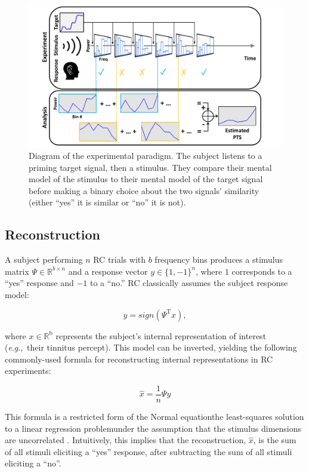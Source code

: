 \documentclass[journal]{IEEEtran}
\newcommand{\eg}{\textit{e}.\textit{g}.,\ }
\begin{document}
\begin{figure}[t]
  \centering
  \includegraphics[width=\linewidth]{experiment_overview.pdf}
  \caption{Diagram of the experimental paradigm. The subject listens to a priming target signal,
then a stimulus. They compare their mental model of the stimulus to their mental model of the target signal
before making a binary choice about the two signals' similarity (either ``yes'' it is similar or ``no'' it is not).}
  \label{fig:experimentdiagram}
\end{figure}

\subsection{Reconstruction}

A subject performing $n$ RC trials with $b$ frequency bins produces a stimulus matrix $\Psi \in \mathbb{R}^{b \times n}$
and a response vector $y \in \{1,-1\}^n$,
where $1$ corresponds to a ``yes'' response and $-1$ to a ``no.'' RC classically assumes the subject response model:

\begin{equation}
  y = sign(\Psi^\mathrm{T} x), 
\end{equation}

where $x \in \mathbb{R}^\mathrm{b}$ represents the subject's internal representation of interest (\eg their tinnitus percept).
This model can be inverted, yielding the following commonly-used formula for reconstructing internal representations in RC experiments:

\begin{equation}
  \hat{x} = \frac{1}{n} \Psi y
  \label{eq:linreg}
\end{equation}

This formula is a restricted form of the Normal equation\textemdash{}the least-squares solution to a linear regression problem\textemdash{}under
the assumption that the stimulus dimensions are uncorrelated \cite{gosselinSuperstitiousPerceptionsReveal2003}.
Intuitively, this implies that the reconstruction, $\hat{x}$, is the sum of all stimuli eliciting a ``yes'' response, after subtracting the sum of all stimuli eliciting a ``no''. 
\end{document}
